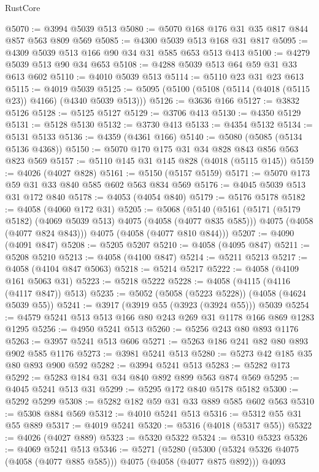 \begin{lexlean}{RustCore}
\begin{coremodule}
@5070 := @3994 @5039 @513
@5080 := @5070 @168 @176 @31 @35 @817 @844 @857 @563 @809 @569
@5085 := @4300 @5039 @513 @168 @31 @817
@5095 := @4309 @5039 @513 @166 @90 @34 @31 @585 @653 @513 @413
@5100 := @4279 @5039 @513 @90 @34 @653
@5108 := @4288 @5039 @513 @64 @59 @31 @33 @613 @602
@5110 := @4010 @5039 @513
@5114 := @5110 @23 @31 @23 @613
@5115 := @4019 @5039
@5125 := @5095 (@5100 (@5108 (@5114 (@4018 (@5115 @23)) @4166) (@4340 @5039 @513)))
@5126 := @3636 @166
@5127 := @3832 @5126
@5128 := @5125 @5127
@5129 := @3706 @413
@5130 := @4350 @5129
@5131 := @5128 @5130
@5132 := @3730 @413
@5133 := @4354 @5132
@5134 := @5131 @5133
@5136 := @4359 (@4361 @166)
@5140 := @5080 (@5085 (@5134 @5136 @4368))
@5150 := @5070 @170 @175 @31 @34 @828 @843 @856 @563 @823 @569
@5157 := @5110 @145 @31 @145 @828 (@4018 (@5115 @145))
@5159 := @4026 (@4027 @828)
@5161 := @5150 (@5157 @5159)
@5171 := @5070 @173 @59 @31 @33 @840 @585 @602 @563 @834 @569
@5176 := @4045 @5039 @513 @31 @172 @840
@5178 := @4053 (@4054 @840)
@5179 := @5176 @5178
@5182 := @4058 (@4060 @172 @31)
@5205 := @5068
    (@5140
      (@5161
        (@5171 (@5179 @5182) (@4069 @5039 @513) @4075 (@4058 (@4077 @835 @585)))
        @4075
        (@4058 (@4077 @824 @843)))
      @4075
      (@4058 (@4077 @810 @844)))
@5207 := @4090 (@4091 @847)
@5208 := @5205 @5207
@5210 := @4058 (@4095 @847)
@5211 := @5208 @5210
@5213 := @4058 (@4100 @847)
@5214 := @5211 @5213
@5217 := @4058 (@4104 @847 @5063)
@5218 := @5214 @5217
@5222 := @4058 (@4109 @161 @5063 @31)
@5223 := @5218 @5222
@5228 := @4058 (@4115 (@4116 (@4117 @847)) @513)
@5235 := @5052 (@5058 (@5223 @5228)) (@4058 (@4624 @5039 @55))
@5241 := @3917 (@3919 @55 (@3923 (@3924 @55))) @5039
@5254 := @4579 @5241 @513 @513 @166 @80 @243 @269 @31 @1178 @166 @869 @1283 @1295
@5256 := @4950 @5241 @513
@5260 := @5256 @243 @80 @893 @1176
@5263 := @3957 @5241 @513 @606
@5271 := @5263 @186 @241 @82 @80 @893 @902 @585 @1176
@5273 := @3981 @5241 @513
@5280 := @5273 @42 @185 @35 @80 @893 @900 @592
@5282 := @3994 @5241 @513
@5283 := @5282 @173
@5292 := @5283 @184 @31 @34 @840 @892 @899 @563 @874 @569
@5295 := @4045 @5241 @513 @31
@5299 := @5295 @172 @840 @5178 @5182
@5300 := @5292 @5299
@5308 := @5282 @182 @59 @31 @33 @889 @585 @602 @563
@5310 := @5308 @884 @569
@5312 := @4010 @5241 @513
@5316 := @5312 @55 @31 @55 @889
@5317 := @4019 @5241
@5320 := @5316 (@4018 (@5317 @55))
@5322 := @4026 (@4027 @889)
@5323 := @5320 @5322
@5324 := @5310 @5323
@5326 := @4069 @5241 @513
@5346 := @5271
    (@5280
      (@5300 (@5324 @5326 @4075 (@4058 (@4077 @885 @585))) @4075 (@4058 (@4077 @875 @892)))
      @4093

\end{coremodule}
\end{lexlean}
